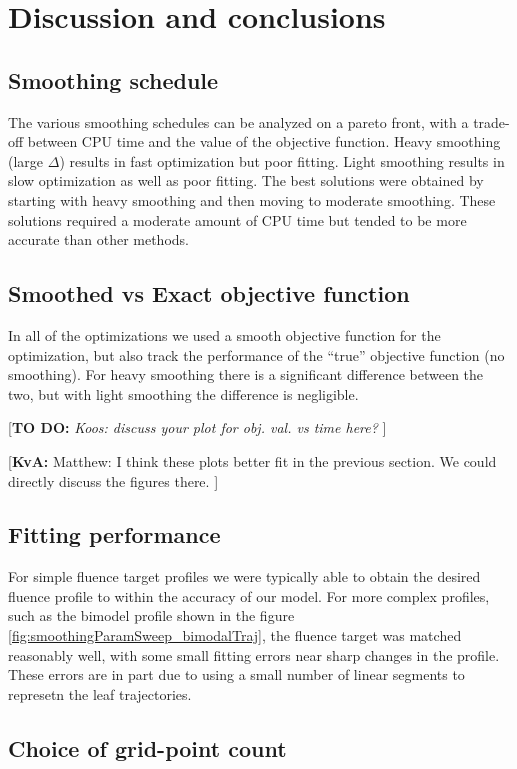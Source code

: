 \documentclass{iopart}
\newcommand{\todo}[1]{{\color{lightblue}\par {[{\bf TO DO: } {\em #1}} ] \\    }}
\newcommand{\KvAcomment}[1]{{\color{magenta}\par {[{\bf KvA: } { #1}} ] \\    }}
\begin{document}
\section{Discussion and conclusions}

\subsection{Smoothing schedule}

The various smoothing schedules can be analyzed on a pareto front, with a trade-off between CPU time and the value of the objective function. Heavy smoothing (large $\Delta$) results in fast optimization but poor fitting. Light smoothing results in slow optimization as well as poor fitting. The best solutions were obtained by starting with heavy smoothing and then moving to moderate smoothing. These solutions required a moderate amount of CPU time but tended to be more accurate than other methods.

\subsection{Smoothed vs Exact objective function}

In all of the optimizations we used a smooth objective function for the optimization, but also track the performance of the ``true'' objective function (no smoothing). For heavy smoothing there is a significant difference between the two, but with light smoothing the difference is negligible.

\todo{Koos: discuss your plot for obj. val. vs time here?}
\KvAcomment{Matthew: I think these plots better fit in the previous section. We could directly discuss the figures there.}

\subsection{Fitting performance}

For simple fluence target profiles we were typically able to obtain the desired fluence profile to within the accuracy of our model. For more complex profiles, such as the bimodel profile shown in the figure \ref{fig:smoothingParamSweep_bimodalTraj}, the fluence target was matched reasonably well, with some small fitting errors near sharp changes in the profile. These errors are in part due to using a small number of linear segments to represetn the leaf trajectories.

\subsection{Choice of grid-point count}
\end{document}

